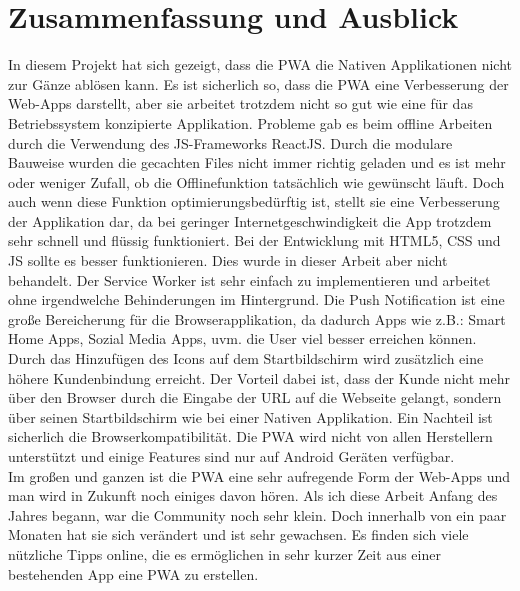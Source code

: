 \chapter{Zusammenfassung und Ausblick}
\thispagestyle{standard}
\pagestyle{standard}
\renewcommand{\footrulewidth}{0.4pt}

In diesem Projekt hat sich gezeigt, dass die \acs{PWA} die Nativen Applikationen nicht zur Gänze ablösen kann. Es ist sicherlich so, dass die \acs{PWA} eine Verbesserung der \acs{Web-App}s darstellt, aber sie arbeitet trotzdem nicht so gut wie eine für das Betriebssystem konzipierte Applikation.
Probleme gab es beim offline Arbeiten durch die Verwendung des \acs{JS}-Frameworks ReactJS. Durch die modulare Bauweise wurden die gecachten Files nicht immer richtig geladen und es ist mehr oder weniger Zufall, ob die Offlinefunktion tatsächlich wie gewünscht läuft. Doch auch wenn diese Funktion optimierungsbedürftig ist, stellt sie eine Verbesserung der Applikation dar, da bei geringer Internetgeschwindigkeit die App trotzdem sehr schnell und flüssig funktioniert. Bei der Entwicklung mit \acs{HTML}5, \acs{CSS} und \acs{JS} sollte es besser funktionieren. Dies wurde in dieser Arbeit aber nicht behandelt. 
Der Service Worker ist sehr einfach zu implementieren und arbeitet ohne irgendwelche Behinderungen im Hintergrund.
Die Push Notification ist eine große Bereicherung für die Browserapplikation, da dadurch Apps wie z.B.: Smart Home Apps, Sozial Media Apps, uvm. die User viel besser erreichen können. Durch das Hinzufügen des Icons auf dem Startbildschirm wird zusätzlich eine höhere Kundenbindung erreicht. Der Vorteil dabei ist, dass der Kunde nicht mehr über den Browser durch die Eingabe der URL auf die Webseite gelangt, sondern über seinen Startbildschirm wie bei einer Nativen Applikation. Ein Nachteil ist sicherlich die Browserkompatibilität. Die \acs{PWA} wird nicht von allen Herstellern unterstützt und einige Features sind nur auf Android Geräten verfügbar. 
\\Im großen und ganzen ist die \acs{PWA} eine sehr aufregende Form der \acs{Web-App}s und man wird in Zukunft noch einiges davon hören.
Als ich diese Arbeit Anfang des Jahres begann, war die Community noch sehr klein. Doch innerhalb von ein paar Monaten hat sie sich verändert und ist sehr gewachsen. Es finden sich viele nützliche Tipps online, die es ermöglichen in sehr kurzer Zeit aus einer bestehenden App eine \acs{PWA} zu erstellen. 